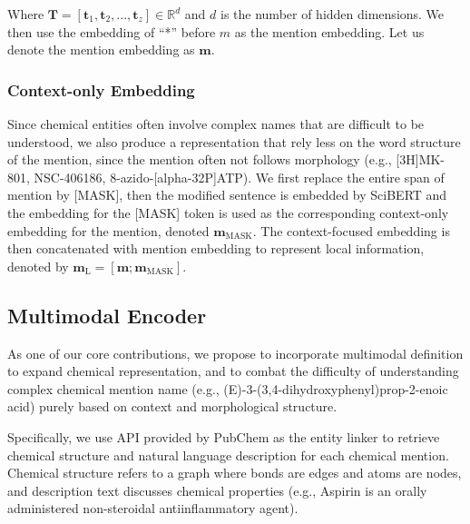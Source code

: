 \noindent Where $\mathbf{T}=[\mathbf{t}_1, \mathbf{t}_2, ..., \mathbf{t}_z] \in \mathbb{R}^d$ and $d$ is the
number of hidden dimensions. We then use the embedding of ``*'' before $m$ as the mention embedding. Let us denote the mention embedding as $\mathbf{m}$.



\subsubsection{Context-only Embedding}
Since chemical entities often involve complex names that are difficult to be understood, we also produce a representation that rely less on the word structure of the mention, since the mention often not follows morphology (e.g., [3H]MK-801, NSC-406186, 8-azido-[alpha-32P]ATP). We first replace the entire span of mention by [MASK], then the modified sentence is embedded by SciBERT and the embedding for the [MASK] token is used as the corresponding context-only embedding for the mention, denoted $\mathbf{m}_\text{MASK}$. The context-focused embedding is then concatenated with mention embedding to represent local information, denoted by $\mathbf{m}_\text{L}=[\mathbf{m};\mathbf{m}_\text{MASK}]$.

\subsection{Multimodal Encoder}
\label{sec:cmsa}


As one of our core contributions, we propose to incorporate multimodal definition to expand chemical representation, and to combat the difficulty of understanding complex chemical mention name (e.g., (E)-3-(3,4-dihydroxyphenyl)prop-2-enoic acid) purely based on context and morphological structure. 

Specifically, we use API provided by PubChem as the entity linker to retrieve chemical structure and natural language description for each chemical mention. Chemical structure refers to a graph where bonds are edges and atoms are nodes, and description text discusses chemical properties (e.g., Aspirin is an orally administered non-steroidal antiinflammatory agent). 

